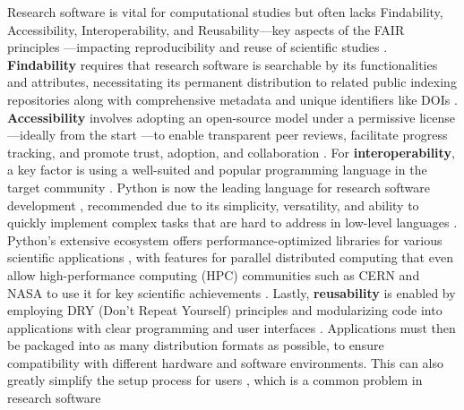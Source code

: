 \documentclass{article}
\begin{document}
Research software is vital for computational studies but often lacks Findability, Accessibility, Interoperability, and Reusability—key aspects of the FAIR principles \cite{FAIR4RS}—impacting reproducibility and reuse of scientific studies \cite{AccessibleReproducibleResearch, ShiningLight, CaseForOpenCompProg, SciSoftwareAccuracy, SurveySEPracticesInScience}. \textbf{Findability} requires that research software is searchable by its functionalities and attributes, necessitating its permanent distribution to related public indexing repositories along with comprehensive metadata and unique identifiers like DOIs \cite{10MetricsForSciSoftware, WhatMakesCompSoftSuccessful, 10SimpleRulesForOpenDevOfSciSoft, 4SimpleRecs, BarelySufficientPracticesInSciComp, ELIXIRSoftwareManagementPlan}. \textbf{Accessibility} involves adopting an open-source model under a permissive license \cite{BusinessOfOpenSource}—ideally from the start \cite{BetterSoftwareBetterResearch, PublishYourCode, POVHowOpenSciHelps}—to enable transparent peer reviews, facilitate progress tracking, and promote trust, adoption, and collaboration \cite{SharingDetailedResData, CaseForOpenCompProg, 10SimpleRulesForOpenDevOfSciSoft}. For \textbf{interoperability}, a key factor is using a well-suited and popular programming language in the target community \cite{RolesOfCodeInCSE, SoftDevEnvForSciSoft}. Python is now the leading language for research software development \cite{SurveySEPracticesInScience2, AnalyzingGitHubRepoOfPapers, DevOpsInSciSysDev}, recommended due to its simplicity, versatility, and ability to quickly implement complex tasks that are hard to address in low-level languages \cite{PythonBatteriesIncluded, PythonForSciComp, PythonForSciAndEng, PythonJupyterEcosystem, SciCompWithPythonOnHPC, PythonEcosystemSciComp, WhatMakesPythonFirstChoice}. Python's extensive ecosystem offers performance-optimized libraries for various scientific applications \cite{NumPy, SciPy, pandas, PyTorch, Top5MLLibPython, ScikitLearn, scikitImage, Matplotlib, Mayavi, IPython, Jupyter, Jupyter2, DaskAndNumba, DaskApplications, Cython, Numba, Pythran, PyCUDA, Astropy, SunPy, Pangeo, MDAnalysis, Biopython, NIPY}, with features for parallel distributed computing \cite{SciCompWithPythonOnHPC, ParallelDistCompUsingPython, ScientistsGuideToCloudComputing, DemystPythonPackageWithCondaEnvMod, PythonAcceleratorsForHPC, DistWorkflowsWithJupyter, InteractiveSupercomputingWithJupyter} that even allow high-performance computing (HPC) communities such as CERN \cite{IntroducingPythonAtCERN, PythonAtCERN} and NASA \cite{PythonAtNASA} to use it for key scientific achievements \cite{PythonScientificSuccessStories, GravWaveDiscovery, BlackHoleImage}. Lastly, \textbf{reusability} is enabled by employing DRY (Don't Repeat Yourself) principles and modularizing code into applications with clear programming and user interfaces \cite{FAIR4RS, 5RecommendedPracticesForCompSci, BestPracticesForSciComp, RolesOfCodeInCSE}. Applications must then be packaged into as many distribution formats as possible, to ensure compatibility with different hardware and software environments. This can also greatly simplify the setup process for users \cite{10RuleForSoftwareInCompBio, ELIXIRSoftwareManagementPlan, WhyJohnnyCantBuild}, which is a common problem in research software 
\end{document}
